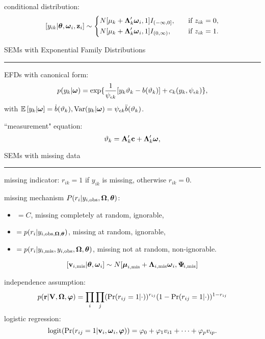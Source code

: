 conditional distribution:
\[
    [y_{ik} \vert \boldsymbol{\theta}, \boldsymbol{\omega}_i, \mathbf{z}_i] \sim \begin{dcases}
        {N}[\mu_k + \boldsymbol{\Lambda}_k' \boldsymbol{\omega}_i, 1] I_{(-\infty, 0]}, \quad & \text{if } z_{ik} = 0,\\
        {N}[\mu_k + \boldsymbol{\Lambda}_k' \boldsymbol{\omega}_i, 1] I_{(0, \infty)}, & \text{if } z_{ik} = 1.
    \end{dcases}
\]




SEMs with Exponential Family Distributions \hrule

EFDs with canonical form:
\[
    p(y_k \vert \boldsymbol{\omega}) = \exp\{ \frac{1}{\psi_{\epsilon k}} [y_k \vartheta_k - b(\vartheta_{k}) ] + c_k(y_k, \psi_{\epsilon k}) \},
\]
with $\mathbb{E}\left[y_k \vert \boldsymbol{\omega}\right] = \dot{b}(\vartheta_k), \text{Var}(y_k \vert \boldsymbol{\omega}) = \psi_{\epsilon k} \ddot{b}(\vartheta_k) $.

``measurement" equation: \[
    \vartheta_k = \mathbf{A}_k' \mathbf{c} + \boldsymbol{\Lambda}_k'\boldsymbol{\omega},
\]


SEMs with missing data \hrule

missing indicator: $r_{ik} = 1$ if $y_{ik}$ is missing, otherwise $r_{ik} = 0$.

missing mechanism $P(r_{i} \vert y_{i, \text{obs}}, \boldsymbol{\Omega}, \boldsymbol{\theta})$: \begin{itemize}
    \item $= C$, missing completely at random, ignorable,
    \item $= p(r_{i} \vert y_{i, \text{obs}, \boldsymbol{\Omega}, \boldsymbol{\theta}})$, missing at random, ignorable,
    \item $= p(r_{i} \vert y_{i, \text{mis}}, y_{i, \text{obs}}, \boldsymbol{\Omega}, \boldsymbol{\theta})$, missing not at random, non-ignorable.
\end{itemize}

\vspace{-2ex}
\[[\mathbf{v}_{i, \text{mis}} \vert \boldsymbol{\theta}, \boldsymbol{\omega}_i] \sim {N}[\boldsymbol{\mu}_{i, \text{mis}} + \boldsymbol{\Lambda}_{i, \text{mis}} \boldsymbol{\omega}_i, \boldsymbol{\Psi}_{\!i, \text{mis}}]\]

independence assumption: \[
    p(\mathbf{r} \vert \mathbf{V}, \boldsymbol{\Omega}, \boldsymbol{\varphi}) 
    = \prod_i \prod_j (\text{Pr}(r_{ij} = 1 \vert \cdot))^{r_{ij}}
    (1 - \text{Pr}(r_{ij} = 1 \vert \cdot))^{1 - r_{ij}}
\]
logistic regression: 
\[\text{logit}(\text{Pr}(r_{ij} = 1 \vert \mathbf{v}_i, \boldsymbol{\omega}_i, \boldsymbol{\varphi})) = \varphi_0 + \varphi_1 v_{i1} + \cdots + \varphi_p v_{ip}.\]

